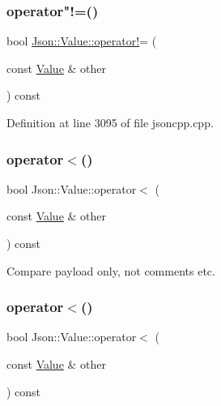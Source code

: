 \hypertarget{class_json_1_1_value_a86e95be072e515c48abc61dec63a1689}{}\label{class_json_1_1_value_a86e95be072e515c48abc61dec63a1689} 
\subsubsection{\texorpdfstring{operator"!=()}{operator!=()}\hspace{0.1cm}{\footnotesize\ttfamily [2/2]}}
{\footnotesize\ttfamily bool \hyperlink{class_json_1_1_value_a731b89fb4764c39ce2328e1707c822b9}{Json\+::\+Value\+::operator!}= (\begin{DoxyParamCaption}\item[{const \hyperlink{class_json_1_1_value}{Value} \&}]{other }\end{DoxyParamCaption}) const}



Definition at line 3095 of file jsoncpp.\+cpp.

\hypertarget{class_json_1_1_value_aac6bd14155b88ed2d39ef54820b39e49}{}\label{class_json_1_1_value_aac6bd14155b88ed2d39ef54820b39e49} 
\subsubsection{\texorpdfstring{operator$<$()}{operator<()}\hspace{0.1cm}{\footnotesize\ttfamily [1/2]}}
{\footnotesize\ttfamily bool Json\+::\+Value\+::operator$<$ (\begin{DoxyParamCaption}\item[{const \hyperlink{class_json_1_1_value}{Value} \&}]{other }\end{DoxyParamCaption}) const}



Compare payload only, not comments etc. 

\hypertarget{class_json_1_1_value_aac6bd14155b88ed2d39ef54820b39e49}{}\label{class_json_1_1_value_aac6bd14155b88ed2d39ef54820b39e49} 
\subsubsection{\texorpdfstring{operator$<$()}{operator<()}\hspace{0.1cm}{\footnotesize\ttfamily [2/2]}}
{\footnotesize\ttfamily bool Json\+::\+Value\+::operator$<$ (\begin{DoxyParamCaption}\item[{const \hyperlink{class_json_1_1_value}{Value} \&}]{other }\end{DoxyParamCaption}) const}



